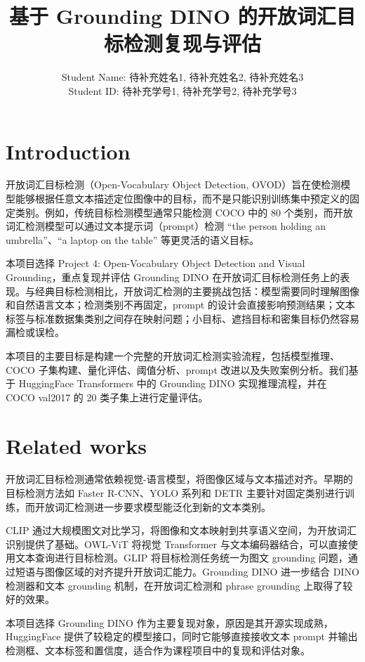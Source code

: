 \documentclass[UTF8,a4paper,11pt]{ctexart}
\title{\textbf{基于 Grounding DINO 的开放词汇目标检测复现与评估}}
\author{
Student Name: 待补充姓名1, 待补充姓名2, 待补充姓名3\\
Student ID: 待补充学号1, 待补充学号2, 待补充学号3
}
\date{}
\begin{document}
\maketitle

\section{Introduction}

开放词汇目标检测（Open-Vocabulary Object Detection, OVOD）旨在使检测模型能够根据任意文本描述定位图像中的目标，而不是只能识别训练集中预定义的固定类别。例如，传统目标检测模型通常只能检测 COCO 中的 80 个类别，而开放词汇检测模型可以通过文本提示词（prompt）检测 ``the person holding an umbrella''、``a laptop on the table'' 等更灵活的语义目标。

本项目选择 Project 4: Open-Vocabulary Object Detection and Visual Grounding，重点复现并评估 Grounding DINO 在开放词汇目标检测任务上的表现。与经典目标检测相比，开放词汇检测的主要挑战包括：模型需要同时理解图像和自然语言文本；检测类别不再固定，prompt 的设计会直接影响预测结果；文本标签与标准数据集类别之间存在映射问题；小目标、遮挡目标和密集目标仍然容易漏检或误检。

本项目的主要目标是构建一个完整的开放词汇检测实验流程，包括模型推理、COCO 子集构建、量化评估、阈值分析、prompt 改进以及失败案例分析。我们基于 HuggingFace Transformers 中的 Grounding DINO 实现推理流程，并在 COCO val2017 的 20 类子集上进行定量评估。

\section{Related works}

开放词汇目标检测通常依赖视觉-语言模型，将图像区域与文本描述对齐。早期的目标检测方法如 Faster R-CNN、YOLO 系列和 DETR 主要针对固定类别进行训练，而开放词汇检测进一步要求模型能泛化到新的文本类别。

CLIP 通过大规模图文对比学习，将图像和文本映射到共享语义空间，为开放词汇识别提供了基础。OWL-ViT 将视觉 Transformer 与文本编码器结合，可以直接使用文本查询进行目标检测。GLIP 将目标检测任务统一为图文 grounding 问题，通过短语与图像区域的对齐提升开放词汇能力。Grounding DINO 进一步结合 DINO 检测器和文本 grounding 机制，在开放词汇检测和 phrase grounding 上取得了较好的效果。

本项目选择 Grounding DINO 作为主要复现对象，原因是其开源实现成熟，HuggingFace 提供了较稳定的模型接口，同时它能够直接接收文本 prompt 并输出检测框、文本标签和置信度，适合作为课程项目中的复现和评估对象。
\end{document}
